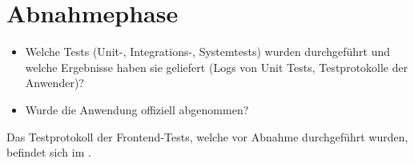 \section{Abnahmephase} 
\label{sec:Abnahmephase}

\begin{itemize}
	\item Welche Tests (\zB Unit-, Integrations-, Systemtests) wurden durchgeführt und welche Ergebnisse haben sie geliefert (\zB Logs von Unit Tests, Testprotokolle der Anwender)?
	\item Wurde die Anwendung offiziell abgenommen?
\end{itemize}

Das Testprotokoll der Frontend-Tests, welche vor Abnahme durchgeführt wurden, befindet sich im .
